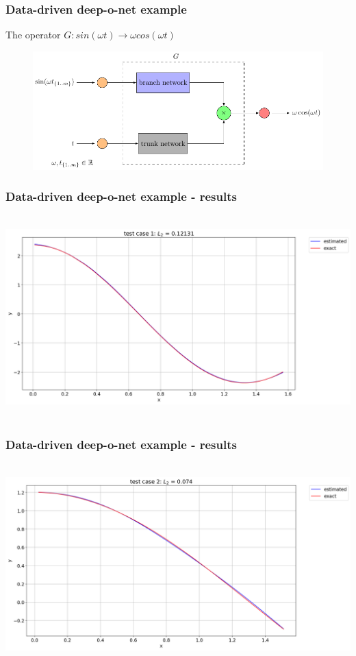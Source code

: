 \begin{frame}
    \frametitle{Data-driven deep-o-net example}

    The operator \(G: sin(\omega t) \to \omega cos(\omega t)\)
    \begin{figure}
       \center
        \includegraphics[scale=0.8]{supportingFiles/schematics/01_sineExample/Don_example.pdf}
    \end{figure}
\end{frame}

\begin{frame}
    \frametitle{Data-driven deep-o-net example - results}
    \hbox{\hspace{-1cm}
        \includegraphics[scale=0.32]{supportingFiles/DON_results/test_case_1.png}\hspace{5cm}
    }
\end{frame}

\begin{frame}
    \frametitle{Data-driven deep-o-net example - results}
    \hbox{\hspace{-1cm}
        \includegraphics[scale=0.32]{supportingFiles/DON_results/test_case_2.png}\hspace{5cm}
    }
\end{frame}

